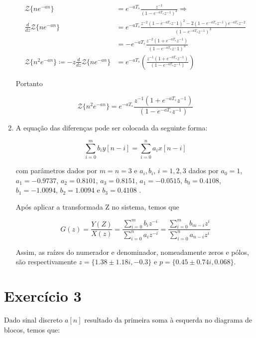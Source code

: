 \documentclass{article}
\begin{document}
\begin{enumerate}
    \begin{equation}
    \begin{split}
    \mathcal{Z}\{n e^{-an}\} & = e^{-a T_s} \frac{z^{-1}}{(1 - e^{-a T_s} z^{-1})^2} \Rightarrow \\ \frac{d}{dz} \mathcal{Z}\{n e^{-an}\} & = e^{- a T_s} \frac{z^{-2}(1 - e^{-a T_s} z^-1)^2 - 2(1 - e^{-a T_s} z^{-1}) e^{-a T_s} z^{-2}}{(1 - e^{-a T_s} z^{-1})^3} \\ 
    & = - e^{-a T_s} \frac{z^{-2} (1 + e^{-a T_s} z^{-1})}{(1 - e^{- a T_s} z^-1)^3} \\
    \mathcal{Z}\{n^2 e^{-a n}\} \coloneqq -z \frac{d}{dz} \mathcal{Z}\{n e^{-a n}\} & = e^{-a T_s} \left( \frac{z^{-1}(1 + e^{-a T_s} z^{-1})}{(1 - e^{-a T_s} z^{-1})} \right)
    \end{split}
    \end{equation}

Portanto 

\begin{equation}
\mathcal{Z}\{n^2 e^{-a n}\} = e^{-a T_s} \frac{z^{-1}(1 + e^{-a T_s} z^{-1})}{(1 - e^{-a T_s} z^{-1})}
\end{equation}

\item %
A equação das diferenças pode ser colocada da seguinte forma:

\begin{equation}
\sum_{i=0}^{m} b_i y[n-i] = \sum_{i=0}^{n} a_i x[n-i]
\end{equation}

com parâmetros dados por $m = n = 3$ e $a_i, b_i$, $i = 1, 2, 3$ dados por $a_0 = 1$, $a_1 = -0.9737$, $a_2 = 0.8101$, $a_3 = 0.8151$, $a_1 = -0.0515$, $b_0 = 0.4108$, $b_1 = -1.0094$, $b_2 = 1.0094$ e $b_3 = 0.4108$ .

Após aplicar a transformada Z no sistema, temos que

\begin{equation}
G(z) = \frac{Y(Z)}{X(z)} = \frac{\sum_{i=0}^{m} b_{i} z^{-i}}{\sum_{i=0}^{n} a_{i} z^{-i}} = \frac{\sum_{i=0}^{m} b_{m-i} z^{i}}{\sum_{i=0}^{n} a_{n-i} z^{i}}
\end{equation}

Assim, as raízes do numerador e denominador, nomeadamente zeros e pólos, são respectivamente $z = \{1.38 \pm 1.18 i, -0.3\}$ e $p = \{0.45 \pm 0.74i, 0.068\}$.

\end{enumerate}

\section*{Exercício 3}
Dado sinal discreto $a[n]$ resultado da primeira soma à esquerda no diagrama de blocos, temos que:
\end{document}

